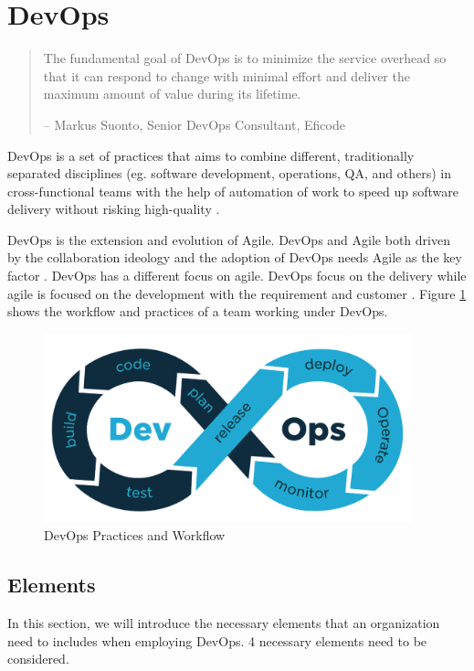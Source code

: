 \section{DevOps}
\begin{quotation}
    The fundamental goal of DevOps is to minimize the service overhead so that it can respond to change with minimal effort and deliver the maximum amount of value during its lifetime.
    \begin{flushright}
        -- Markus Suonto, Senior DevOps Consultant, Eficode
    \end{flushright}
\end{quotation}
\label{devops}
DevOps is a set of practices that aims to combine different, traditionally separated disciplines (eg. software development, operations, QA, and others) in cross-functional teams with the help of automation of work to speed up software delivery without risking high-quality \cite{bass2015devops}.
\par
DevOps is the extension and evolution \cite{lwakatare2016relationship}\cite{leite2019survey} of Agile. DevOps and Agile both driven by the collaboration ideology and the adoption of DevOps needs Agile as the key factor \cite{lwakatare2016relationship}. DevOps has a different focus on agile. DevOps focus on the delivery while agile is focused on the development with the requirement and customer \cite{buchanan2015agile}. Figure \ref{fig:DevOps} shows the workflow and practices of a team working under DevOps.
\begin{figure}[h]
    \centering
    \includegraphics[width=0.95\textwidth]{pics/DevOps.png}
    \caption{DevOps Practices and Workflow \cite{DevOpsin72:online}}
    \label{fig:DevOps}
\end{figure}
\subsection{Elements}
In this section, we will introduce the necessary elements that an organization need to includes when employing DevOps. 4 necessary elements need to be considered.
